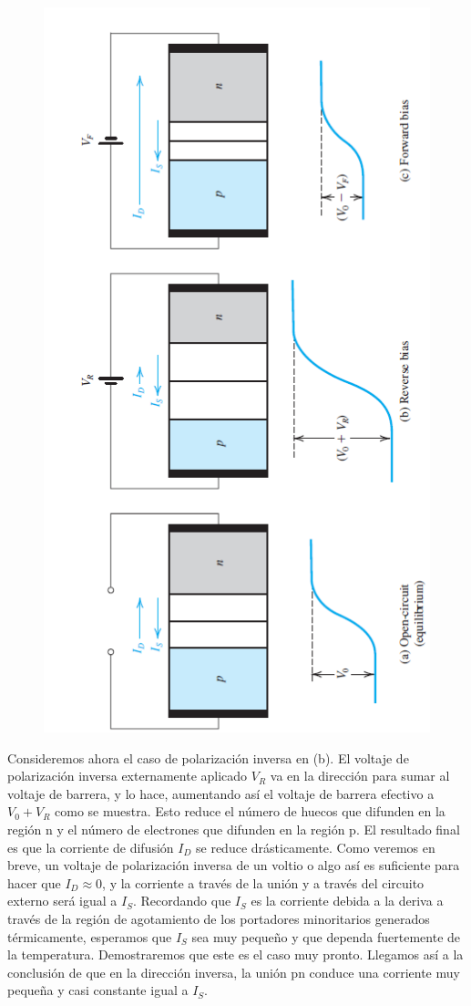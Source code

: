 \begin{figure}[H]
    \centering
    \includegraphics[scale=0.6,angle=-90]{Electronica/pn_f4.png}
\end{figure}

Consideremos ahora el caso de polarización inversa en (b). El voltaje de polarización inversa externamente aplicado \(V_R\) va en la dirección para sumar al voltaje de barrera, y lo hace, aumentando así el voltaje de barrera efectivo a \(V_0 + V_R\) como se muestra. Esto reduce el número de huecos que difunden en la región n y el número de electrones que difunden en la región p. El resultado final es que la corriente de difusión \(I_D\) se reduce drásticamente. Como veremos en breve, un voltaje de polarización inversa de un voltio o algo así es suficiente para hacer que \(I_D \approx 0\), y la corriente a través de la unión y a través del circuito externo será igual a \(I_S\). Recordando que \(I_S\) es la corriente debida a la deriva a través de la región de agotamiento de los portadores minoritarios generados térmicamente, esperamos que \(I_S\) sea muy pequeño y que dependa fuertemente de la temperatura. Demostraremos que este es el caso muy pronto. Llegamos así a la conclusión de que en la dirección inversa, la unión pn conduce una corriente muy pequeña y casi constante igual a \(I_S\).

